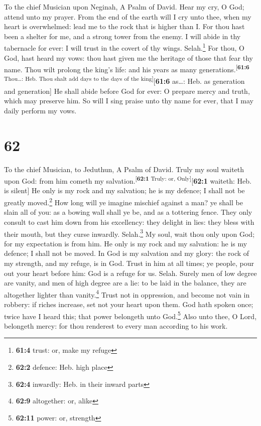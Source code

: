 To the chief Musician upon Neginah, A Psalm of David. 
Hear my cry, O God; attend unto my prayer.  From the end
of the earth will I cry unto thee, when my heart is overwhelmed: lead me
to the rock that is higher than I.  For thou hast been a
shelter for me, and a strong tower from the enemy.  I will
abide in thy tabernacle for ever: I will trust in the covert of thy
wings. Selah.\footnote{\textbf{61:4} trust: or, make my refuge}
 For thou, O God, hast heard my vows: thou hast given me
the heritage of those that fear thy name.  Thou wilt
prolong the king's life: and his years as many
generations.\textsuperscript{{[}\textbf{61:6} Thou\ldots: Heb. Thou
shalt add days to the days of the king{]}}{[}\textbf{61:6} as\ldots:
Heb. as generation and generation{]}  He shall abide
before God for ever: O prepare mercy and truth, which may preserve him.
 So will I sing praise unto thy name for ever, that I may
daily perform my vows.

\hypertarget{section-61}{%
\section{62}\label{section-61}}

To the chief Musician, to Jeduthun, A Psalm of David. 
Truly my soul waiteth upon God: from him cometh my
salvation.\textsuperscript{{[}\textbf{62:1} Truly: or,
Only{]}}{[}\textbf{62:1} waiteth: Heb. is silent{]}  He
only is my rock and my salvation; he is my defence; I shall not be
greatly moved.\footnote{\textbf{62:2} defence: Heb. high place}
 How long will ye imagine mischief against a man? ye shall
be slain all of you: as a bowing wall shall ye be, and as a tottering
fence.  They only consult to cast him down from his
excellency: they delight in lies: they bless with their mouth, but they
curse inwardly. Selah.\footnote{\textbf{62:4} inwardly: Heb. in their
  inward parts}  My soul, wait thou only upon God; for my
expectation is from him.  He only is my rock and my
salvation: he is my defence; I shall not be moved.  In God
is my salvation and my glory: the rock of my strength, and my refuge, is
in God.  Trust in him at all times; ye people, pour out
your heart before him: God is a refuge for us. Selah. 
Surely men of low degree are vanity, and men of high degree are a lie:
to be laid in the balance, they are altogether lighter than
vanity.\footnote{\textbf{62:9} altogether: or, alike} 
Trust not in oppression, and become not vain in robbery: if riches
increase, set not your heart upon them.  God hath spoken
once; twice have I heard this; that power belongeth unto God.\footnote{\textbf{62:11}
  power: or, strength}  Also unto thee, O Lord, belongeth
mercy: for thou renderest to every man according to his work.

